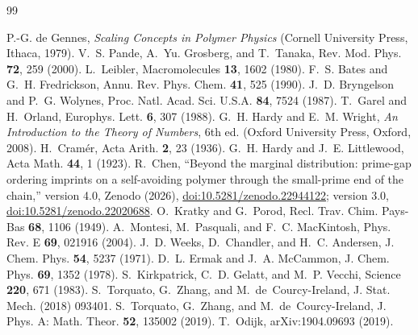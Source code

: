 \documentclass[reprint,amsmath,amssymb,aps,pre,longbibliography]{revtex4-2}
\begin{document}
\setlength{\bibsep}{0pt plus 0.2ex}
\begin{thebibliography}{99}

 P.-G. de Gennes, \emph{Scaling Concepts in Polymer Physics}
(Cornell University Press, Ithaca, 1979).
 V.~S. Pande, A.~Yu. Grosberg, and T.~Tanaka, Rev. Mod. Phys. \textbf{72}, 259 (2000).
 L.~Leibler, Macromolecules \textbf{13}, 1602 (1980).
 F.~S. Bates and G.~H. Fredrickson, Annu. Rev. Phys. Chem. \textbf{41}, 525 (1990).
 J.~D. Bryngelson and P.~G. Wolynes, Proc. Natl. Acad. Sci. U.S.A. \textbf{84}, 7524 (1987).
 T.~Garel and H.~Orland, Europhys. Lett. \textbf{6}, 307 (1988).
 G.~H. Hardy and E.~M. Wright, \emph{An Introduction to the Theory of Numbers},
6th ed. (Oxford University Press, Oxford, 2008).
 H.~Cram\'er, Acta Arith. \textbf{2}, 23 (1936).
 G.~H. Hardy and J.~E. Littlewood, Acta Math. \textbf{44}, 1 (1923).
 R.~Chen, ``Beyond the marginal distribution: prime-gap ordering imprints on a
self-avoiding polymer through the small-prime end of the chain,'' version 4.0, Zenodo (2026),
\href{https://doi.org/10.5281/zenodo.22944122}{doi:10.5281/zenodo.22944122}; version 3.0,
\href{https://doi.org/10.5281/zenodo.22020688}{doi:10.5281/zenodo.22020688}.
 O.~Kratky and G.~Porod, Recl. Trav. Chim. Pays-Bas \textbf{68}, 1106 (1949).
 A.~Montesi, M.~Pasquali, and F.~C. MacKintosh, Phys. Rev. E \textbf{69}, 021916 (2004).
 J.~D. Weeks, D.~Chandler, and H.~C. Andersen, J. Chem. Phys. \textbf{54}, 5237 (1971).
 D.~L. Ermak and J.~A. McCammon, J. Chem. Phys. \textbf{69}, 1352 (1978).
 S.~Kirkpatrick, C.~D. Gelatt, and M.~P. Vecchi, Science \textbf{220}, 671 (1983).
 S.~Torquato, G.~Zhang, and M.~de~Courcy-Ireland, J. Stat. Mech. (2018) 093401.
 S.~Torquato, G.~Zhang, and M.~de~Courcy-Ireland, J. Phys. A: Math. Theor. \textbf{52}, 135002 (2019).
 T.~Odijk, arXiv:1904.09693 (2019).

\end{thebibliography}
\end{document}
